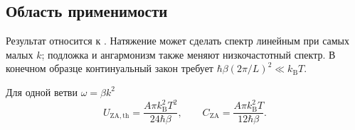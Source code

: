 \documentclass[../final.tex]{subfiles}
\begin{document}
\subsection*{Область применимости}

Результат относится к .
Натяжение может сделать спектр линейным при самых малых $k$;
подложка и ангармонизм также меняют низкочастотный спектр.
В конечном образце континуальный закон требует
$\hbar\beta(2\pi/L)^2\ll k_{\mathrm B}T$.

\answer
Для одной ветви $\omega=\beta k^2$
\[
    U_{\mathrm{ZA,th}}=\frac{A\pi k_{\mathrm B}^2T^2}{24\hbar\beta},
    \qquad C_{\mathrm{ZA}}=\frac{A\pi k_{\mathrm B}^2T}{12\hbar\beta}.
\]
\end{document}
